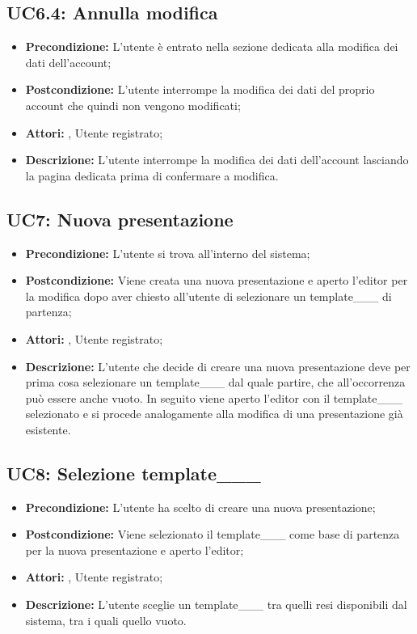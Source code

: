 \subsection{ UC6.4: Annulla modifica}

\begin{itemize}
	\item \textbf{Precondizione:} L’utente è entrato nella sezione dedicata alla modifica dei dati dell’account;
	\item \textbf{Postcondizione:} L’utente interrompe la modifica dei dati del proprio account che quindi non vengono modificati;
	\item \textbf{Attori:} , Utente registrato;
	\item \textbf{Descrizione:} L’utente interrompe la modifica dei dati dell’account lasciando la pagina dedicata prima di confermare a modifica.
\end{itemize}
\subsection{ UC7: Nuova presentazione}

\begin{itemize}
	\item \textbf{Precondizione:} L’utente si trova all’interno del sistema;
	\item \textbf{Postcondizione:} Viene creata una nuova presentazione e aperto l’editor per la modifica dopo aver chiesto all’utente di selezionare un template___ di partenza;
	\item \textbf{Attori:} , Utente registrato;
	\item \textbf{Descrizione:} L’utente che decide di creare una nuova presentazione deve per prima cosa selezionare un template___ dal quale partire, che all’occorrenza può essere anche vuoto. In seguito viene aperto l’editor con il template___ selezionato e si procede analogamente alla modifica di una presentazione già esistente.
\end{itemize}
\subsection{ UC8: Selezione template___}

\begin{itemize}
	\item \textbf{Precondizione:} L’utente ha scelto di creare una nuova presentazione;
	\item \textbf{Postcondizione:} Viene selezionato il template___ come base di partenza per la nuova presentazione e aperto l’editor;
	\item \textbf{Attori:} , Utente registrato;
	\item \textbf{Descrizione:} L’utente sceglie un template___ tra quelli resi disponibili dal sistema, tra i quali quello vuoto.
\end{itemize}
